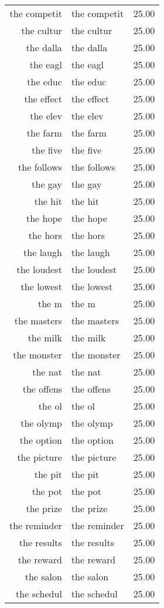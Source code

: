 \begin{table}[ht]
\begin{tabular}{rlr}
  the competit & the competit & 25.00 \\ 
  the cultur & the cultur & 25.00 \\ 
  the dalla & the dalla & 25.00 \\ 
  the eagl & the eagl & 25.00 \\ 
  the educ & the educ & 25.00 \\ 
  the effect & the effect & 25.00 \\ 
  the elev & the elev & 25.00 \\ 
  the farm & the farm & 25.00 \\ 
  the five & the five & 25.00 \\ 
  the follows & the follows & 25.00 \\ 
  the gay & the gay & 25.00 \\ 
  the hit & the hit & 25.00 \\ 
  the hope & the hope & 25.00 \\ 
  the hors & the hors & 25.00 \\ 
  the laugh & the laugh & 25.00 \\ 
  the loudest & the loudest & 25.00 \\ 
  the lowest & the lowest & 25.00 \\ 
  the m & the m & 25.00 \\ 
  the masters & the masters & 25.00 \\ 
  the milk & the milk & 25.00 \\ 
  the monster & the monster & 25.00 \\ 
  the nat & the nat & 25.00 \\ 
  the offens & the offens & 25.00 \\ 
  the ol & the ol & 25.00 \\ 
  the olymp & the olymp & 25.00 \\ 
  the option & the option & 25.00 \\ 
  the picture & the picture & 25.00 \\ 
  the pit & the pit & 25.00 \\ 
  the pot & the pot & 25.00 \\ 
  the prize & the prize & 25.00 \\ 
  the reminder & the reminder & 25.00 \\ 
  the results & the results & 25.00 \\ 
  the reward & the reward & 25.00 \\ 
  the salon & the salon & 25.00 \\ 
  the schedul & the schedul & 25.00 \\ 

\end{tabular}
\end{table}
